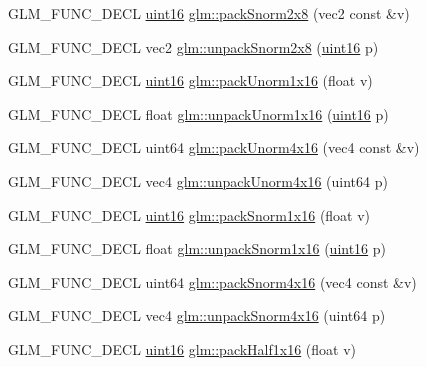 \begin{DoxyCompactItemize}
\item 
G\+L\+M\+\_\+\+F\+U\+N\+C\+\_\+\+D\+E\+C\+L \hyperlink{stb__image_8c_a05f6b0ae8f6a6e135b0e290c25fe0e4e}{uint16} \hyperlink{group__gtc__packing_ga05d08a82923166ec7cd5d0e6154c9953}{glm\+::pack\+Snorm2x8} (vec2 const \&v)
\item 
G\+L\+M\+\_\+\+F\+U\+N\+C\+\_\+\+D\+E\+C\+L vec2 \hyperlink{group__gtc__packing_ga27f30f0281b88e152b0895f5e2ead878}{glm\+::unpack\+Snorm2x8} (\hyperlink{stb__image_8c_a05f6b0ae8f6a6e135b0e290c25fe0e4e}{uint16} p)
\item 
G\+L\+M\+\_\+\+F\+U\+N\+C\+\_\+\+D\+E\+C\+L \hyperlink{stb__image_8c_a05f6b0ae8f6a6e135b0e290c25fe0e4e}{uint16} \hyperlink{group__gtc__packing_ga60c7d915f5653559ae02c2f79a8c5c1d}{glm\+::pack\+Unorm1x16} (float v)
\item 
G\+L\+M\+\_\+\+F\+U\+N\+C\+\_\+\+D\+E\+C\+L float \hyperlink{group__gtc__packing_ga7770e3ade4f4764cc1b2eb42ac4ec188}{glm\+::unpack\+Unorm1x16} (\hyperlink{stb__image_8c_a05f6b0ae8f6a6e135b0e290c25fe0e4e}{uint16} p)
\item 
G\+L\+M\+\_\+\+F\+U\+N\+C\+\_\+\+D\+E\+C\+L uint64 \hyperlink{group__gtc__packing_gac561f06c908b7302537a8ef29fcb409e}{glm\+::pack\+Unorm4x16} (vec4 const \&v)
\item 
G\+L\+M\+\_\+\+F\+U\+N\+C\+\_\+\+D\+E\+C\+L vec4 \hyperlink{group__gtc__packing_gafb2b502bc406031a5618ce930139a9e3}{glm\+::unpack\+Unorm4x16} (uint64 p)
\item 
G\+L\+M\+\_\+\+F\+U\+N\+C\+\_\+\+D\+E\+C\+L \hyperlink{stb__image_8c_a05f6b0ae8f6a6e135b0e290c25fe0e4e}{uint16} \hyperlink{group__gtc__packing_gac29411d6c0f6ed0fe9f0396dfe92e0e8}{glm\+::pack\+Snorm1x16} (float v)
\item 
G\+L\+M\+\_\+\+F\+U\+N\+C\+\_\+\+D\+E\+C\+L float \hyperlink{group__gtc__packing_ga246f451cebf590726324f7a283e3d65e}{glm\+::unpack\+Snorm1x16} (\hyperlink{stb__image_8c_a05f6b0ae8f6a6e135b0e290c25fe0e4e}{uint16} p)
\item 
G\+L\+M\+\_\+\+F\+U\+N\+C\+\_\+\+D\+E\+C\+L uint64 \hyperlink{group__gtc__packing_ga9b237d7c66b7a71964e6d1f4dc06539f}{glm\+::pack\+Snorm4x16} (vec4 const \&v)
\item 
G\+L\+M\+\_\+\+F\+U\+N\+C\+\_\+\+D\+E\+C\+L vec4 \hyperlink{group__gtc__packing_ga1bfaa3f217fd7a4b6b9d3117ecb3fcac}{glm\+::unpack\+Snorm4x16} (uint64 p)
\item 
G\+L\+M\+\_\+\+F\+U\+N\+C\+\_\+\+D\+E\+C\+L \hyperlink{stb__image_8c_a05f6b0ae8f6a6e135b0e290c25fe0e4e}{uint16} \hyperlink{group__gtc__packing_gaba534b320836a35372e00af5771dd1a2}{glm\+::pack\+Half1x16} (float v)

\end{DoxyCompactItemize}
